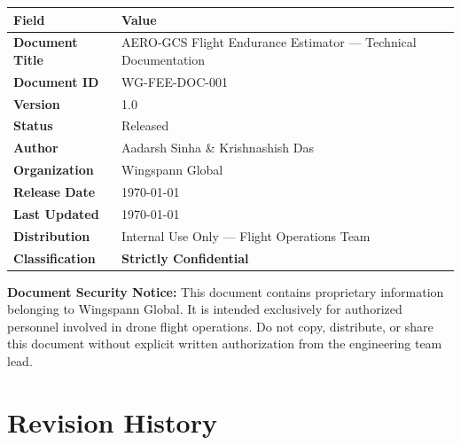 \documentclass[11pt,a4paper]{article}
\begin{document}
\begin{table}[H]
    \renewcommand{\arraystretch}{1.5}
    \begin{tabularx}{\textwidth}{@{}lX@{}}
        \toprule
        \textbf{Field} & \textbf{Value} \\
        \midrule
        \textbf{Document Title} & AERO-GCS Flight Endurance Estimator --- Technical Documentation \\
        \textbf{Document ID}    & WG-FEE-DOC-001 \\
        \textbf{Version}        & 1.0 \\
        \textbf{Status}         & Released \\
        \midrule
        \textbf{Author}         & Aadarsh Sinha \& Krishnashish Das \\
        \textbf{Organization}   & Wingspann Global \\
        \midrule
        \textbf{Release Date}   & \today \\
        \textbf{Last Updated}   & \today \\
        \midrule
        \textbf{Distribution}   & Internal Use Only --- Flight Operations Team \\
        \textbf{Classification} & \textcolor{alertred}{\textbf{Strictly Confidential}} \\
        \bottomrule
    \end{tabularx}
\end{table}

\vspace{1cm}

\begin{alertbox}
    \textbf{Document Security Notice:} This document contains proprietary information belonging to Wingspann Global. It is intended exclusively for authorized personnel involved in drone flight operations. Do not copy, distribute, or share this document without explicit written authorization from the engineering team lead.
\end{alertbox}

\newpage
\section*{Revision History}
\end{document}
